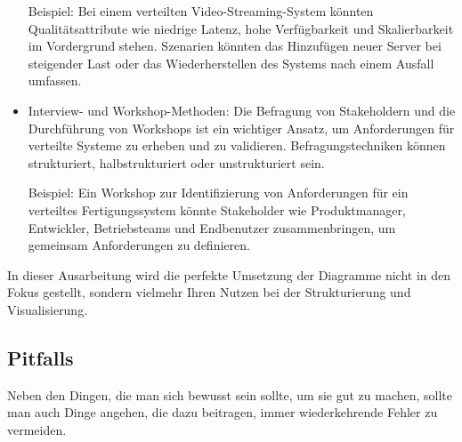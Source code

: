 \documentclass[../vs-script-first-v01.tex]{subfiles}
\begin{document}
\begin{itemize}
Beispiel: Bei einem verteilten Video-Streaming-System könnten Qualitätsattribute wie niedrige Latenz, hohe Verfügbarkeit und Skalierbarkeit im Vordergrund stehen. Szenarien könnten das Hinzufügen neuer Server bei steigender Last oder das Wiederherstellen des Systems nach einem Ausfall umfassen.

\item Interview- und Workshop-Methoden: Die Befragung von Stakeholdern und die Durchführung von Workshops ist ein wichtiger Ansatz, um Anforderungen für verteilte Systeme zu erheben und zu validieren. Befragungstechniken können strukturiert, halbstrukturiert oder unstrukturiert sein.

Beispiel: Ein Workshop zur Identifizierung von Anforderungen für ein verteiltes Fertigungssystem könnte Stakeholder wie Produktmanager, Entwickler, Betriebsteams und Endbenutzer zusammenbringen, um gemeinsam Anforderungen zu definieren.
\end{itemize}   

In dieser Ausarbeitung wird die perfekte Umsetzung der Diagramme nicht in den Fokus gestellt, sondern vielmehr Ihren Nutzen bei der Strukturierung und Visualisierung.

\subsection{Pitfalls}

Neben den Dingen, die man sich bewusst sein sollte, um sie gut zu machen, sollte man auch Dinge angehen, die dazu beitragen, immer wiederkehrende Fehler zu vermeiden. 
\end{document}
